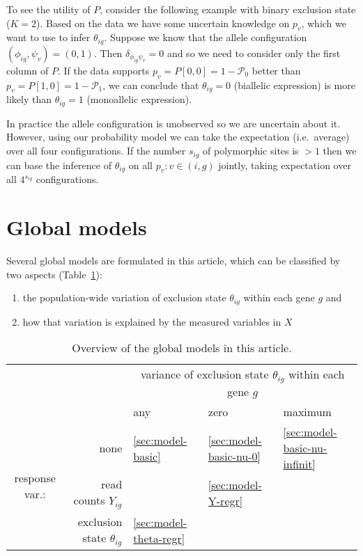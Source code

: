 \documentclass[letterpaper]{article}
\begin{document}
To see the utility of \(P\), consider the following example with binary
exclusion state (\(K=2\)).  Based on the data we have some uncertain
knowledge on \(p_v\), which we want to use to infer \(\theta_{ig}\).  Suppose
we know that the allele configuration \((\phi_{ig},\psi_v)=(0,1)\).  Then
\(\delta_{\phi_{ig}\psi_v}=0\) and so we need to consider only the first
column of \(P\).  If the data supports \(p_v = P[0,0] = 1-\mathcal{P}_0\)
better than \(p_v = P[1,0] = 1-\mathcal{P}_1\), we can conclude that
\(\theta_{ig}=0\) (biallelic expression) is more likely than \(\theta_{ig}=1\)
(monoallelic expression).

In practice the allele configuration is unobserved so we are uncertain about
it.  However, using our probability model we can take the expectation
(i.e.~average) over all four configurations.  If the number \(s_{ig}\) of
polymorphic sites is \(>1\) then we can base the inference of \(\theta_{ig}\)
on all \(p_v: v\in(i,g)\) jointly, taking expectation over all \(4^{s_{ig}}\)
configurations.

\section{Global models}
\label{sec:models}

Several global models are formulated in this article, which can be classified
by two aspects (Table~\ref{tab:model-overview}):
\begin{enumerate}
\item
the population-wide variation
of exclusion state \(\theta_{ig}\) within each gene \(g\) and
\item how that variation is explained by the measured variables in \(X\)
\end{enumerate}

\begin{table}[b]
\begin{tabular}{cr|p{2.2 cm}p{2.2 cm}p{2.2 cm}|}
& & \multicolumn{3}{c|}{ variance of exclusion state \(\theta_{ig}\) within each gene \(g\) } \\
& & any & zero & maximum  \\
\hline
\multirow{3}{*}{response var.:} & none & \ref{sec:model-basic} & \ref{sec:model-basic-nu-0} & \ref{sec:model-basic-nu-infinit} \\
& read counts
\(Y_{ig}\) & & \ref{sec:model-Y-regr} & \\
& exclusion state \(\theta_{ig}\) & \ref{sec:model-theta-regr} & & \\
\hline
\end{tabular}
\caption{
Overview of the global models in this article.
}
\label{tab:model-overview}
\end{table}
\end{document}
